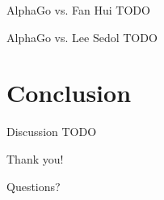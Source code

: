 \documentclass{beamer}
\newcommand{\todo}{\alert{TODO}}
\begin{document}
  {

    \begin{frame}{AlphaGo vs. Fan Hui}
      \todo
    \end{frame}

    \begin{frame}{AlphaGo vs. Lee Sedol}
      \todo
    \end{frame}
  }


  \section{Conclusion}

  \begin{frame}{Discussion}
    \todo
  \end{frame}

  \begin{frame}[standout]
    \begin{center}
      Thank you!
      \pause

      Questions?
    \end{center}
  \end{frame}
\end{document}

